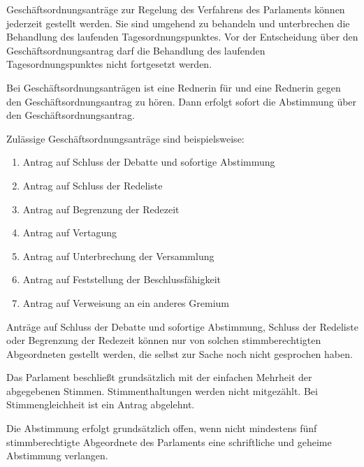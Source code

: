 \documentclass{sasbase}
\begin{document}
\begin{article}[Geschäftsordnungsantr\"{a}ge]
	\item Geschäftsordnungsanträge zur Regelung des Verfahrens des Parlaments können jederzeit gestellt werden. Sie sind umgehend zu behandeln und unterbrechen die Behandlung des laufenden Tagesordnungspunktes. Vor der Entscheidung über den Geschäftsordnungsantrag darf die Behandlung des laufenden Tagesordnungspunktes nicht fortgesetzt werden.
	\item Bei Geschäftsordnungsanträgen ist eine Rednerin  für und eine Rednerin gegen den Geschäftsordnungsantrag zu hören. Dann erfolgt sofort die Abstimmung über den Geschäftsordnungsantrag.
	\item Zulässige Geschäftsordnungsanträge sind beispielsweise:
		\begin{enumerate}
			\item Antrag auf Schluss der Debatte und sofortige Abstimmung   
			\item Antrag auf Schluss der Redeliste
			\item Antrag auf Begrenzung der Redezeit
			\item Antrag auf Vertagung
			\item Antrag auf Unterbrechung der Versammlung
			\item Antrag auf Feststellung der Beschlussfähigkeit   
			\item Antrag auf Verweisung an ein anderes Gremium
		\end{enumerate}
	\item Anträge auf Schluss der Debatte und sofortige Abstimmung, Schluss der Redeliste oder Begrenzung der Redezeit können nur von solchen stimmberechtigten Abgeordneten gestellt werden, die selbst zur Sache noch nicht gesprochen haben.
\end{article}
\begin{article}[Abstimmungen]
	\item Das Parlament beschließt grundsätzlich mit der einfachen Mehrheit der abgegebenen Stimmen. Stimmenthaltungen werden nicht mitgezählt. Bei Stimmengleichheit ist ein Antrag abgelehnt.
	\item Die Abstimmung erfolgt grundsätzlich offen, wenn nicht mindestens f\"{u}nf stimmberechtigte Abgeordnete des Parlaments eine schriftliche und geheime Abstimmung verlangen.
\end{article}
\end{document}
